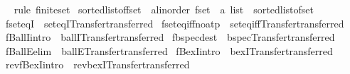 \begin{isabellebody}
\isadelimproof
\ %
\endisadelimproof
%
\isatagproof
{}\isamarkupfalse%
\ {\isacharparenleft}rule\ finite{\isacharunderscore}set{\isacharparenright}%
\endisatagproof
{\isafoldproof}%
%
\isadelimproof
%
\endisadelimproof
\isanewline
\isanewline
{}\isamarkupfalse%
\ sorted{\isacharunderscore}list{\isacharunderscore}of{\isacharunderscore}fset\ {\isacharcolon}{\isacharcolon}\ {\isachardoublequoteopen}{\isacharprime}a{\isacharcolon}{\isacharcolon}linorder\ fset\ {\isasymRightarrow}\ {\isacharprime}a\ list{\isachardoublequoteclose}\ \ sorted{\isacharunderscore}list{\isacharunderscore}of{\isacharunderscore}set%
\isadelimproof
\ %
\endisadelimproof
%
\isatagproof
\isacommand{{\isachardot}}\isamarkupfalse%
%
\endisatagproof
{\isafoldproof}%
%
\isadelimproof
%
\endisadelimproof
%
\isadelimdocument
%
\endisadelimdocument
%
\isatagdocument
%
\isamarkuptrue%
%
\endisatagdocument
{\isafolddocument}%
%
\isadelimdocument
%
\endisadelimdocument
{}\isamarkupfalse%
\ fset{\isacharunderscore}eqI\ {\isacharequal}\ set{\isacharunderscore}eqI{\isacharbrackleft}Transfer{\isachardot}transferred{\isacharbrackright}\isanewline
{}\isamarkupfalse%
\ fset{\isacharunderscore}eq{\isacharunderscore}iff{\isacharbrackleft}no{\isacharunderscore}atp{\isacharbrackright}\ {\isacharequal}\ set{\isacharunderscore}eq{\isacharunderscore}iff{\isacharbrackleft}Transfer{\isachardot}transferred{\isacharbrackright}\isanewline
{}\isamarkupfalse%
\ fBallI{\isacharbrackleft}intro{\isacharbang}{\isacharbrackright}\ {\isacharequal}\ ballI{\isacharbrackleft}Transfer{\isachardot}transferred{\isacharbrackright}\isanewline
{}\isamarkupfalse%
\ fbspec{\isacharbrackleft}dest{\isacharquery}{\isacharbrackright}\ {\isacharequal}\ bspec{\isacharbrackleft}Transfer{\isachardot}transferred{\isacharbrackright}\isanewline
{}\isamarkupfalse%
\ fBallE{\isacharbrackleft}elim{\isacharbrackright}\ {\isacharequal}\ ballE{\isacharbrackleft}Transfer{\isachardot}transferred{\isacharbrackright}\isanewline
{}\isamarkupfalse%
\ fBexI{\isacharbrackleft}intro{\isacharbrackright}\ {\isacharequal}\ bexI{\isacharbrackleft}Transfer{\isachardot}transferred{\isacharbrackright}\isanewline
{}\isamarkupfalse%
\ rev{\isacharunderscore}fBexI{\isacharbrackleft}intro{\isacharquery}{\isacharbrackright}\ {\isacharequal}\ rev{\isacharunderscore}bexI{\isacharbrackleft}Transfer{\isachardot}transferred{\isacharbrackright}\isanewline

\end{isabellebody}
